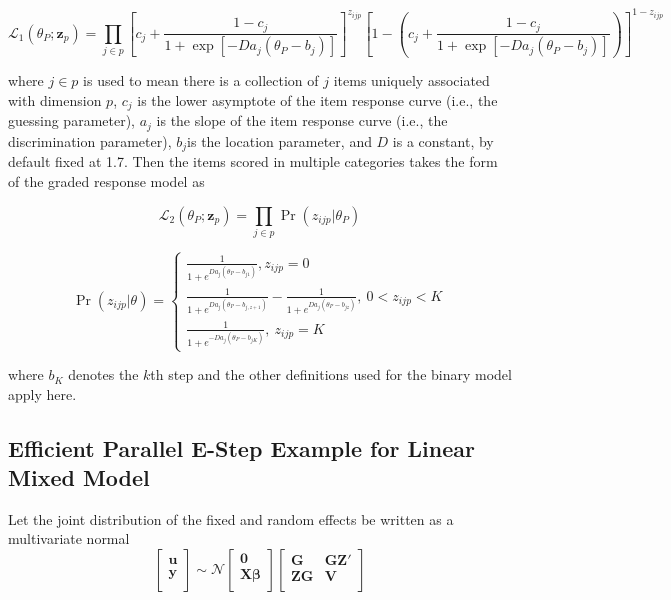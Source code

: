 \documentclass[12pt]{article}
\begin{document}
\begin{equation}
\mathcal{L}_1(\theta_P;\bm{z}_p) = \prod_{j \in p}\left[c_j+\frac{1-c_j}{1+\exp[-Da_j(\theta_P-b_j)]}\right]^{z_{ijp}}\left[1-\left(c_j+\frac{1-c_j}{1+\exp[-Da_j(\theta_P-b_j)]}\right)\right]^{1-z_{ijp}}\nonumber
\end{equation}

\noindent where $j \in p$ is used to mean there is a collection of $j$ items uniquely associated with dimension $p$, $c_j$ is the lower asymptote of the item response curve (i.e., the guessing parameter), $a_j$ is the slope of the item response curve (i.e., the discrimination parameter), $b_j$is the location parameter, and $D$ is a constant, by default fixed at 1.7. Then the items scored in multiple categories takes the form of the graded response model as

\begin{equation}
\mathcal{L}_2(\theta_P;\bm{z}_p) = \prod_{j \in p}\Pr(z_{ijp}|\theta_P)\nonumber
\end{equation}

\begin{equation}
\Pr(z_{ijp}|\theta)=\left\{  \begin{array}{c}
\frac{1}{1+e^{Da_j(\theta_P-b_{j1})}},z_{ijp}=0 \\
\frac{1}{1+e^{Da_j(\theta_P-b_{j,z+1})}} - \frac{1}{1+e^{Da_j(\theta_P-b_{jz})}}, \ 0 < z_{ijp} < K \\
\frac{1}{1+e^{-Da_j(\theta_P-b_{jK})}},\ z_{ijp}=K 
 \end{array} \right. 
\end{equation} 
 
\noindent where $b_K$ denotes the $k$th step and the other definitions used for the binary model apply here.

\subsection*{Efficient Parallel E-Step Example for Linear Mixed Model}

Let the joint distribution of the fixed and random effects be written as a multivariate normal
\begin{equation}
\left [ 
\begin{array}{cc}
\bm{u} \\
\bm{y} \\
\end{array}
\right ]
\sim \mathcal{N}
\left [ 
\begin{array}{cc}
\bm{0} \\
\bm{X\beta} \\
\end{array}
\right ]
\left [ 
\begin{array}{cccc}
\bm{G} & \bm{GZ'} \\
\bm{ZG} & \bm{V} \\
\end{array}
\right ]
\end{equation}
\end{document}
